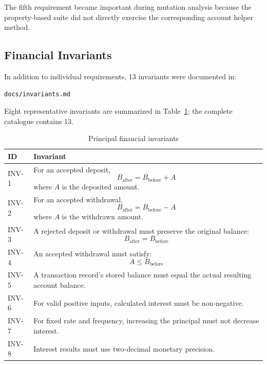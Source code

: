 \documentclass[12pt]{article}
\begin{document}
The fifth requirement became important during mutation analysis because the
property-based suite did not directly exercise the corresponding account
helper method.

\subsection{Financial Invariants}

In addition to individual requirements, 13 invariants were documented in:

\begin{verbatim}
docs/invariants.md
\end{verbatim}

Eight representative invariants are summarized in
Table~\ref{tab:principal-invariants}; the complete catalogue contains 13.

\begin{table}[H]
\centering
\caption{Principal financial invariants}
\label{tab:principal-invariants}

\begin{tabular}{|p{2cm}|p{11.5cm}|}
\hline
\textbf{ID} & \textbf{Invariant} \\
\hline

INV-1 &
For an accepted deposit,
\[
B_{\text{after}} = B_{\text{before}} + A
\]
where \(A\) is the deposited amount. \\
\hline

INV-2 &
For an accepted withdrawal,
\[
B_{\text{after}} = B_{\text{before}} - A
\]
where \(A\) is the withdrawn amount. \\
\hline

INV-3 &
A rejected deposit or withdrawal must preserve the original balance:
\[
B_{\text{after}} = B_{\text{before}}
\] \\
\hline

INV-4 &
An accepted withdrawal must satisfy:
\[
A \leq B_{\text{before}}
\] \\
\hline

INV-5 &
A transaction record's stored balance must equal the actual resulting
account balance. \\
\hline

INV-6 &
For valid positive inputs, calculated interest must be non-negative. \\
\hline

INV-7 &
For fixed rate and frequency, increasing the principal must not decrease
interest. \\
\hline

INV-8 &
Interest results must use two-decimal monetary precision. \\
\hline

\end{tabular}
\end{table}
\end{document}
